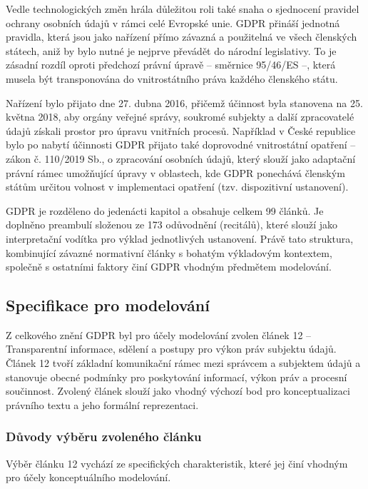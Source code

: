 Vedle technologických změn hrála důležitou roli také snaha o sjednocení pravidel ochrany osobních údajů v rámci celé Evropské unie. GDPR přináší jednotná pravidla, která jsou jako nařízení přímo závazná a použitelná ve všech členských státech, aniž by bylo nutné je nejprve převádět do národní legislativy. To je zásadní rozdíl oproti předchozí právní úpravě – směrnice 95/46/ES –, která musela být transponována do vnitrostátního práva každého členského státu. \cite{esipa}

Nařízení bylo přijato dne 27. dubna 2016, přičemž účinnost byla stanovena na 25. května 2018, aby orgány veřejné správy, soukromé subjekty a další zpracovatelé údajů získali prostor pro úpravu vnitřních procesů. Například v České republice bylo po nabytí účinnosti GDPR přijato také doprovodné vnitrostátní opatření – zákon č. 110/2019 Sb., o zpracování osobních údajů, který slouží jako adaptační právní rámec umožňující úpravy v oblastech, kde GDPR ponechává členským státům určitou volnost v implementaci opatření (tzv. dispozitivní ustanovení). \cite{mvčr_gdpr}

GDPR je rozděleno do jedenácti kapitol a obsahuje celkem 99 článků. Je doplněno preambulí složenou ze 173 odůvodnění (recitálů), které slouží jako interpretační vodítka pro výklad jednotlivých ustanovení. Právě tato struktura, kombinující závazné normativní články s bohatým výkladovým kontextem, společně s ostatními faktory činí GDPR vhodným předmětem modelování. \cite{GDPR}


\subsection{Specifikace pro modelování}
\label{sec:specifikace-pro-modelovani}
Z celkového znění GDPR byl pro účely modelování zvolen článek 12 – Transparentní informace, sdělení a postupy pro výkon práv subjektu údajů. \cite{clanek12} Článek 12 tvoří základní komunikační rámec mezi správcem a subjektem údajů a stanovuje obecné podmínky pro poskytování informací, výkon práv a procesní součinnost. Zvolený článek slouží jako vhodný výchozí bod pro konceptualizaci právního textu a jeho formální reprezentaci.


\subsubsection{Důvody výběru zvoleného článku}
\label{sec:duvody-vyberu-zvoleneho-clanku}
Výběr článku 12 vychází ze specifických charakteristik, které jej činí vhodným pro účely konceptuálního modelování.

